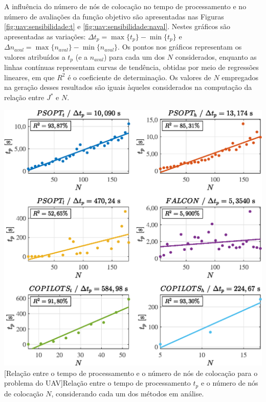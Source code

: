 
A influência do número de nós de colocação no tempo de processamento e no número de avaliações da função objetivo são apresentadas nas Figuras \ref{fig:uav:sensibilidade:t} e \ref{fig:uav:sensibilidade:naval}. Nestes gráficos são apresentadas as variações: $ \Delta t_p = \max\{t_p\} - \min\{t_p\} $ e $ \Delta n_{aval} = \max\{n_{aval}\} - \min\{n_{aval}\} $. Os pontos nos gráficos representam os valores atribuídos a $ t_p $ (e a $ n_{aval} $) para cada um dos $ N $ considerados, enquanto as linhas contínuas representam curvas de tendência, obtidas por meio de regressões lineares, em que $R^2$ é o coeficiente de determinação. Os valores de $ N $ empregados na geração desses resultados são iguais àqueles considerados na computação da relação entre $ J^* $ e $ N $. 

\noindent
\begin{minipage}{\textwidth}
	\vspace{\onelineskip}
	\centering
	\includegraphics[scale=0.7]{fig/resultados/uav/sens/t}
	[Relação entre o tempo de processamento e o número de nós de colocação para o problema do UAV]{Relação entre o tempo de processamento $ t_p $ e o número de nós de colocação $ N $, considerando cada um dos métodos em análise.}
	\label{fig:uav:sensibilidade:t}
	\vspace{\onelineskip}
\end{minipage}

